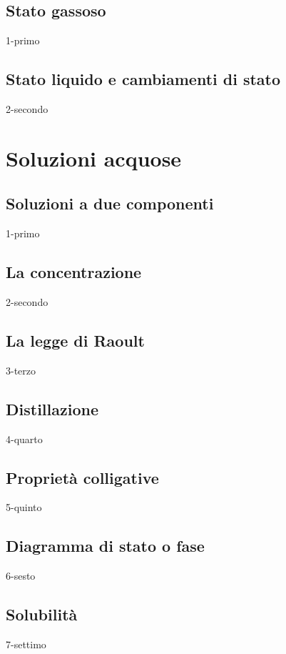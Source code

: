 \documentclass[openany,12pt]{book}%
\begin{document}
\section{Stato gassoso}
{1-primo}

\section{Stato liquido e cambiamenti di stato}
{2-secondo}

\chapter{Soluzioni acquose}

\section{Soluzioni a due componenti}
{1-primo}

\section{La concentrazione}
{2-secondo}

\section{La legge di Raoult}
{3-terzo}

\vspace{-0.3cm}\section{Distillazione}
{4-quarto}

\section{Proprietà colligative}
{5-quinto}

\newpage

\section{Diagramma di stato o fase}
{6-sesto}

\newpage

\section{Solubilità}
{7-settimo}
\end{document}
